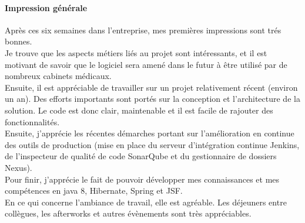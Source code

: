 \paragraph*{Impression générale\\}
Après ces six semaines dans l'entreprise, mes premières impressions sont trés bonnes. \\
Je trouve que les aspects métiers liés au projet sont intéressants, et il est motivant de savoir que le logiciel sera amené dans le futur à être utilisé par de nombreux cabinets médicaux.\\
Ensuite, il est appréciable de travailler sur un projet relativement récent (environ un an). Des efforts importants sont portés sur la conception et l'architecture de la solution. Le code est donc clair, maintenable et il est facile de rajouter des fonctionnalités.\\ 
Ensuite, j'apprécie les récentes démarches portant sur l'amélioration en continue des outils de production (mise en place du serveur d'intégration continue Jenkins, de l'inspecteur de qualité de code SonarQube et du gestionnaire de dossiers Nexus).\\
Pour finir, j'apprécie le fait de pouvoir développer mes connaissances et mes compétences en java 8, Hibernate, Spring et JSF.\\

En ce qui concerne l'ambiance de travail, elle est agréable. Les déjeuners entre collègues, les afterworks et autres évènements sont très appréciables.